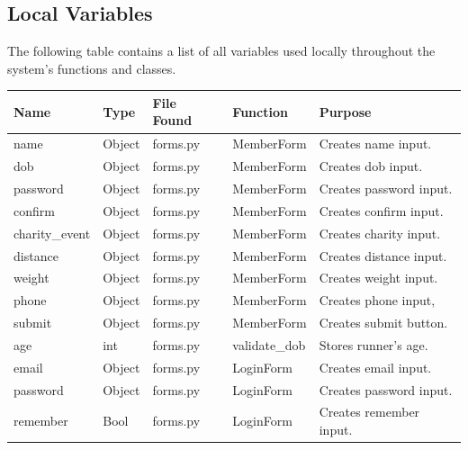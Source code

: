 \documentclass{article}[12pt,a4paper]
\begin{document}
\subsection{Local Variables}
The following table contains a list of all variables used locally throughout the system's functions and classes.
\begin{longtable}{|l|l|l|l|l|}
\hline
\textbf{Name}   & \textbf{Type} & \textbf{File Found} & \textbf{Function}       & \textbf{Purpose}                \\ \hline
name            & Object        & forms.py            & MemberForm              & Creates name input.         \\ \hline
dob             & Object        & forms.py            & MemberForm              & Creates dob input.          \\ \hline
password        & Object        & forms.py            & MemberForm              & Creates password input.     \\ \hline
confirm         & Object        & forms.py            & MemberForm              & Creates confirm input.      \\ \hline
charity\_event  & Object        & forms.py            & MemberForm              & Creates charity input.      \\ \hline
distance        & Object        & forms.py            & MemberForm              & Creates distance input.     \\ \hline
weight          & Object        & forms.py            & MemberForm              & Creates weight input.       \\ \hline
phone           & Object        & forms.py            & MemberForm              & Creates phone input,        \\ \hline
submit          & Object        & forms.py            & MemberForm              & Creates submit button.      \\ \hline
age             & int           & forms.py            & validate\_dob           & Stores runner's age.          \\ \hline
email           & Object        & forms.py            & LoginForm               & Creates email input.        \\ \hline
password        & Object        & forms.py            & LoginForm               & Creates password input.     \\ \hline
remember        & Bool          & forms.py            & LoginForm               & Creates remember input.     \\ \hline

\end{longtable}
\end{document}
